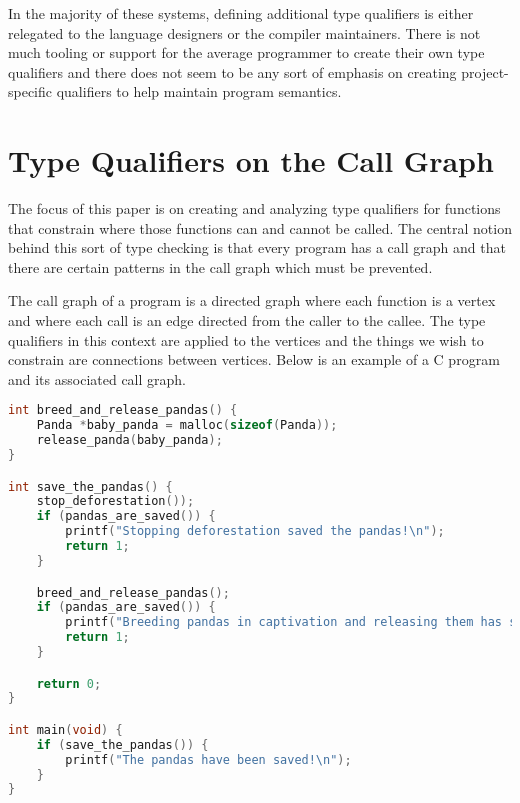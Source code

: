 In the majority of these systems, defining additional type qualifiers is either relegated to the language designers or the compiler maintainers.  There is not much tooling or support for the average programmer to create their own type qualifiers and there does not seem to be any sort of emphasis on creating project-specific qualifiers to help maintain program semantics.

\section{Type Qualifiers on the Call Graph}\label{sec:bac:callgraph}

The focus of this paper is on creating and analyzing type qualifiers for functions that constrain where those functions can and cannot be called.  The central notion behind this sort of type checking is that every program has a call graph and that there are certain patterns in the call graph which must be prevented.  

The call graph of a program is a directed graph where each function is a vertex and where each call is an edge directed from the caller to the callee.  The type qualifiers in this context are applied to the vertices and the things we wish to constrain are connections between vertices.  Below is an example of a C program and its associated call graph.

\begin{minipage}[c]{0.95\textwidth}
\begin{lstlisting}[language=C,caption={Example C program.  The call graph for this program is shown in Figure \ref{fig:pandacallgraph}},label={lst:pandasource}]
int breed_and_release_pandas() {
    Panda *baby_panda = malloc(sizeof(Panda));
    release_panda(baby_panda);
}

int save_the_pandas() {
	stop_deforestation());
	if (pandas_are_saved()) {
		printf("Stopping deforestation saved the pandas!\n");
		return 1;
	}

	breed_and_release_pandas();
	if (pandas_are_saved()) {
		printf("Breeding pandas in captivation and releasing them has saved the pandas!\n");
		return 1;
	}

	return 0;
}

int main(void) {
	if (save_the_pandas()) {
		printf("The pandas have been saved!\n");
	}
}
\end{lstlisting}
\end{minipage}



